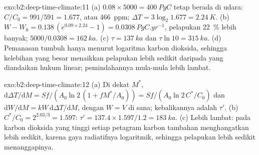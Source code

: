 \begin{solution}{exo:b2:deep-time-climate:11}
(a) $0.08\times5000 = \qty{400}{PgC}$ tetap berada di udara: $C/C_0 = 991/591 = 1.677$, atau
\qty{466}{ppm}; $\Delta T = 3\log_2 1.677 = \qty{2.24}{K}$. (b) $W - W_0 = 0.138\,(e^{0.09\times2.24}
- 1) = \qty{0.0308}{PgC.yr^{-1}}$, pelapukan \qty{22}{\percent} lebih banyak; $5000/0.0308 =
\qty{162}{ka}$. (c) $\tau = \qty{137}{ka}$ dan $\tau\ln10 = \qty{315}{ka}$. (d) Pemanasan tumbuh
hanya menurut logaritma karbon dioksida, sehingga kelebihan yang besar menaikkan pelapukan lebih sedikit daripada
yang diandaikan hukum linear; pemindahannya mula-mula lebih lambat.
\end{solution}

\begin{solution}{exo:b2:deep-time-climate:12}
(a) Di dekat $M^*$, $\mathrm d\Delta T/\mathrm dM = Sf/(A_0\ln 2\,(1 + fM^*/A_0)) = Sf/(A_0\ln 2\,
C^*/C_0)$ dan $\mathrm dW/\mathrm dM = kW\,\mathrm d\Delta T/\mathrm dM$, dengan $W = V$ di sana;
kebalikannya adalah $\tau'$. (b) $C^*/C_0 = 2^{2.03/3} = 1.597$: $\tau' = 137.4\times1.597/1.2 =
\qty{183}{ka}$. (c) Lebih lambat: pada karbon dioksida yang tinggi setiap petagram karbon tambahan menghangatkan lebih sedikit,
karena gaya radiatifnya logaritmik, sehingga pelapukan lebih sedikit menanggapinya.
\end{solution}

